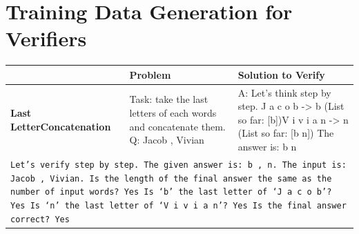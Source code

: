 

\section{Training Data Generation for Verifiers}
\label{sec:data_details}


\begin{table}[ht]
\footnotesize
    \centering
    \begin{tabular}{ | p{2.8cm} | p{6cm} | p{6.5cm} | }
    \toprule
       & 
      \textbf{Problem} & 
      \textbf{Solution to Verify} \\ \midrule

\textbf{Last Letter\newline Concatenation} & 
Task: take the last letters of each words and concatenate them. \newline Q: Jacob , Vivian & 
A: Let's think step by step.\newline
J a c o b -> b (List so far: [b])\newline V i v i a n -> n (List so far: [b n]) \newline The answer is: b n
\\ \midrule\multicolumn{3}{|p{15cm}|}{
\texttt{{Let's verify step by step.}
\newline
The given answer is: b , n.
The input is: Jacob , Vivian.\newline
Is the length of the final answer the same as the number of input words? Yes \newline
Is `b' the last letter of `J a c o b'? Yes\newline
Is `n' the last letter of `V i v i a n'? Yes\newline
Is the final answer correct? Yes
}} \\ \midrule


\end{tabular}
\end{table}
